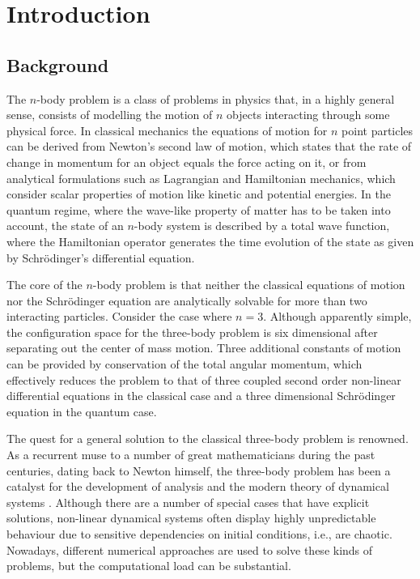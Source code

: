 \chapter{Introduction}
\section{Background}
The $n$-body problem is a class of problems in physics that, in a highly general sense, consists of modelling the motion of $n$ objects interacting through some physical force. In classical mechanics the equations of motion for $n$ point particles can be derived from Newton's second law of motion, which states that the rate of change in momentum for an object equals the force acting on it, or from analytical formulations such as Lagrangian and Hamiltonian mechanics, which consider scalar properties of motion like kinetic and potential energies. In the quantum regime, where the wave-like property of matter has to be taken into account, the state of an $n$-body system is described by a total wave function, where the Hamiltonian operator generates the time evolution of the state as given by Schr{\"o}dinger's differential equation.

The core of the $n$-body problem is that neither the classical equations of motion nor the Schr{\"o}dinger equation are analytically solvable for more than two interacting particles. Consider the case where $n=3$. Although apparently simple, the configuration space for the three-body problem is six dimensional after separating out the center of mass motion. Three additional constants of motion can be provided by conservation of the total angular momentum, which effectively reduces the problem to that of three coupled second order non-linear differential equations in the classical case and a three dimensional Schr{\"o}dinger equation in the quantum case. 

The quest for a general solution to the classical three-body problem is renowned. As a recurrent muse to a number of great mathematicians during the past centuries, dating back to Newton himself, the three-body problem has been a catalyst for the development of analysis and the modern theory of dynamical systems \cite{Chenciner2015}. Although there are a number of special cases that have explicit solutions, non-linear dynamical systems often display highly unpredictable behaviour due to sensitive dependencies on initial conditions, i.e., are chaotic. Nowadays, different numerical approaches are used to solve these kinds of problems, but the computational load can be substantial. 

